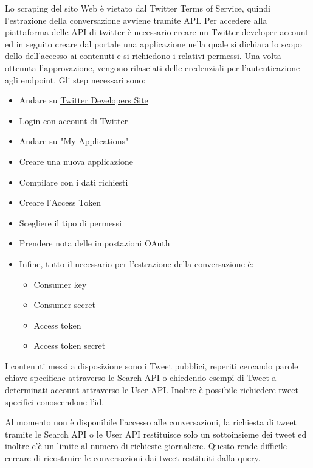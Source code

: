 Lo scraping del sito Web è vietato dal Twitter Terms of Service, quindi l'estrazione della conversazione avviene tramite API. Per accedere alla piattaforma delle API di twitter è necessario creare un Twitter developer account ed in seguito creare dal portale una applicazione nella quale si dichiara lo scopo dello dell'accesso ai contenuti e si richiedono i relativi permessi. Una volta ottenuta l'approvazione, vengono rilasciati delle credenziali per l'autenticazione agli endpoint. Gli step necessari sono:
  

\begin{itemize}  
    \item Andare su {\color{blue}\underline{\href{https://.dev.twitter.com}{Twitter Developers Site}}}
    \item Login con account di Twitter
    \item Andare su "My Applications"
    \item Creare una nuova applicazione
    \item Compilare con i dati richiesti
    \item Creare l'Access Token
    \item Scegliere il tipo di permessi
    \item Prendere nota delle impostazioni OAuth
    \item Infine, tutto il necessario per l'estrazione della conversazione è: \begin{itemize}
        \item Consumer key
        \item Consumer secret
        \item Access token
        \item Access token secret
    \end{itemize}
\end{itemize}

I contenuti messi a disposizione sono i Tweet pubblici, reperiti cercando parole chiave specifiche attraverso le Search API o chiedendo esempi di Tweet a determinati account attraverso le User API. Inoltre è possibile richiedere tweet specifici conoscendone l'id.

Al momento non è disponibile l'accesso alle conversazioni, la richiesta di tweet tramite le Search API o le User API restituisce solo un sottoinsieme dei tweet ed inoltre c'è un limite al numero di richieste giornaliere. Questo rende difficile cercare di ricostruire le conversazioni dai tweet restituiti dalla query. 

